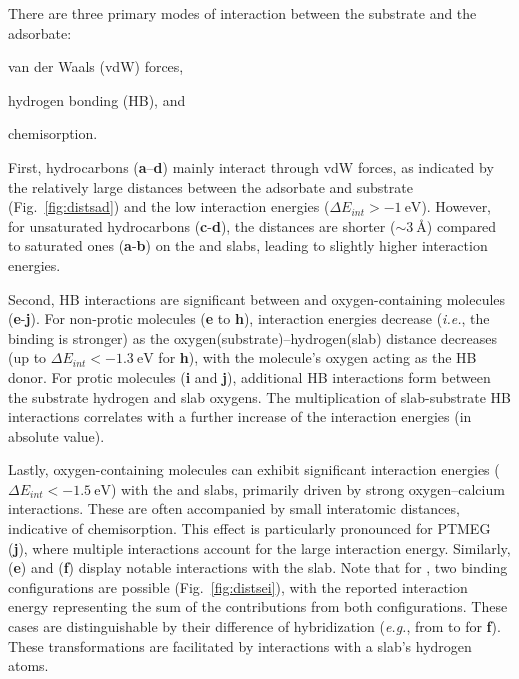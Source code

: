 \documentclass[%
aip,
amsmath,amssymb,
preprint,%
jcp,
showkeys,
]{revtex4-2}
\begin{document}
\clearpage

There are three primary modes of interaction between the substrate and the adsorbate: \begin{inparaenum}[i)] \item van der Waals (vdW) forces, 
\item hydrogen bonding (HB), and 
\item chemisorption. 
\end{inparaenum}
First, hydrocarbons (\textbf{a}–\textbf{d}) mainly interact through vdW forces, as indicated by the relatively large distances between the adsorbate and substrate (Fig.~\ref{fig:distsad}) and the low interaction energies ($\Delta E_{int} > \SI{-1}{\electronvolt}$). However, for unsaturated hydrocarbons (\textbf{c}-\textbf{d}), the distances are shorter ($\sim\SI{3}{\angstrom}$) compared to saturated ones (\textbf{a}-\textbf{b}) on the  and  slabs, leading to slightly higher interaction energies.

Second, HB interactions are significant between  and oxygen-containing mole\-cules (\textbf{e}-\textbf{j}). For non-protic molecules (\textbf{e} to \textbf{h}), interaction energies decrease (\textit{i.e.}, the binding is stronger) as the oxygen(substrate)--hydrogen(slab) distance decreases (up to $\Delta E_{int}<\SI{-1.3}{\electronvolt}$ for \textbf{h}), with the molecule's oxygen acting as the HB donor. For protic molecules (\textbf{i} and \textbf{j}), additional HB interactions form between the substrate hydrogen and slab oxygens. The multiplication of slab-substrate HB interactions correlates with a further increase of the interaction energies (in absolute value).


Lastly, oxygen-containing molecules can exhibit significant interaction energies ($\Delta E_{int} < \SI{-1.5}{\electronvolt}$) with the  and  slabs, primarily driven by strong oxygen--calcium interactions. These are often accompanied by small interatomic distances, indicative of chemisorption. This effect is particularly pronounced for PTMEG (\textbf{j}), where multiple interactions account for the large interaction energy. Similarly,  (\textbf{e}) and  (\textbf{f}) display notable interactions with the  slab. Note that for , two binding configurations are possible (Fig.~\ref{fig:distsei}), with the reported interaction energy representing the sum of the contributions from both configurations. These cases are distinguishable by their difference of hybridization (\textit{e.g.}, from  to  for \textbf{f}). These transformations are facilitated by interactions with a slab’s hydrogen atoms.
\end{document}
